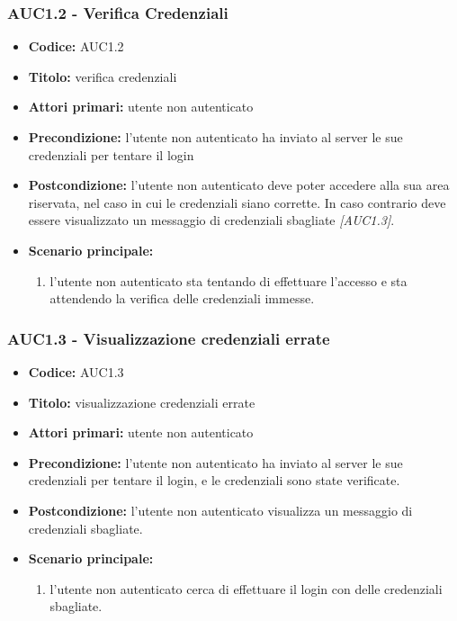 \documentclass[casi-duso]{subfiles}
\begin{document}
\subsubsection{AUC1.2 - Verifica Credenziali}%
\label{subsub:AUC1.2}
\begin{itemize}
  \item \textbf{Codice:} AUC1.2
  \item \textbf{Titolo:} verifica credenziali
  \item \textbf{Attori primari:} utente non autenticato
  \item \textbf{Precondizione:} l'utente non autenticato ha inviato al server le sue credenziali per tentare il login
  \item \textbf{Postcondizione:} l'utente non autenticato deve poter accedere alla sua area riservata, nel caso in cui le credenziali siano corrette. In caso
  contrario deve essere visualizzato un messaggio di credenziali sbagliate \emph{[AUC1.3]}.
  \item \textbf{Scenario principale:}
  \begin{enumerate}
    \item l'utente non autenticato sta tentando di effettuare l'accesso e sta attendendo la verifica delle credenziali immesse.
  \end{enumerate}
\end{itemize}

\subsubsection{AUC1.3 - Visualizzazione credenziali errate}%
\label{subsub:AUC1.3}
\begin{itemize}
  \item \textbf{Codice:} AUC1.3
  \item \textbf{Titolo:} visualizzazione credenziali errate
  \item \textbf{Attori primari:} utente non autenticato
  \item \textbf{Precondizione:} l'utente non autenticato ha inviato al server le sue credenziali per tentare il login, e le credenziali sono state verificate.
  \item \textbf{Postcondizione:} l'utente non autenticato visualizza un messaggio di credenziali sbagliate.
  \item \textbf{Scenario principale:}
  \begin{enumerate}
    \item l'utente non autenticato cerca di effettuare il login con delle credenziali sbagliate.
  \end{enumerate}
\end{itemize}
\end{document}
